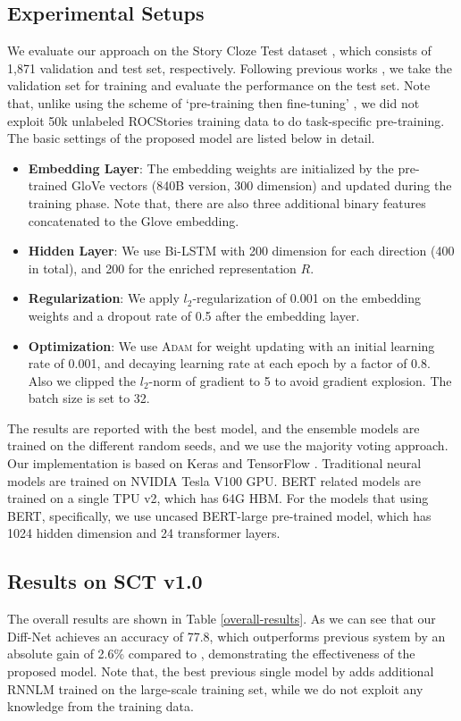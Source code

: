 \documentclass[letterpaper]{article} %
\begin{document}
\subsection{Experimental Setups}
We evaluate our approach on the Story Cloze Test dataset \cite{mostafazadeh-etal-2016}, which consists of 1,871 validation and test set, respectively.
Following previous works \cite{cai-etal-2017,chaturvedi-etal-2017,schwartz-etal-2017}, we take the validation set for training and evaluate the performance on the test set.
Note that, unlike using the scheme of `pre-training then fine-tuning' \cite{liu-etal-2017}, we did not exploit 50k unlabeled ROCStories training data to do task-specific pre-training.
The basic settings of the proposed model are listed below in detail.
\begin{itemize}
\item {\bf Embedding Layer}: The embedding weights are initialized by the pre-trained GloVe vectors (840B version, 300 dimension) \cite{pennington-etal-2014} and updated during the training phase. Note that, there are also three additional binary features concatenated to the Glove embedding.
\item {\bf Hidden Layer}: We use Bi-LSTM with 200 dimension for each direction (400 in total), and 200 for the enriched representation $R$.
\item {\bf Regularization}: We apply $l_2$-regularization of 0.001 on the embedding weights and a dropout \cite{srivastava-etal-2014} rate of 0.5 after the embedding layer.
\item {\bf Optimization}: We use \textsc{Adam} for weight updating \cite{kingma2014adam} with an initial learning rate of 0.001, and decaying learning rate at each epoch by a factor of 0.8. Also we clipped the $l_2$-norm of gradient to 5 \cite{pascanu-etal-2013} to avoid gradient explosion. The batch size is set to 32.
\end{itemize}

The results are reported with the best model, and the ensemble models are trained on the different random seeds, and we use the majority voting approach.
Our implementation is based on Keras \cite{chollet2015keras} and TensorFlow \cite{abadi2016tensorflow}.
Traditional neural models are trained on NVIDIA Tesla V100 GPU. BERT related models are trained on a single TPU v2, which has 64G HBM.
For the models that using BERT, specifically, we use uncased BERT-large pre-trained model, which has 1024 hidden dimension and 24 transformer layers.

\subsection{Results on SCT v1.0}
The overall results are shown in Table \ref{overall-results}.
As we can see that our Diff-Net achieves an accuracy of 77.8, which outperforms previous system by an absolute gain of 2.6\% compared to \citeauthor{schwartz-etal-2017} , demonstrating the effectiveness of the proposed model.
Note that, the best previous single model by \citeauthor{schwartz-etal-2017}  adds additional RNNLM trained on the large-scale training set, while we do not exploit any knowledge from the training data.
\end{document}
